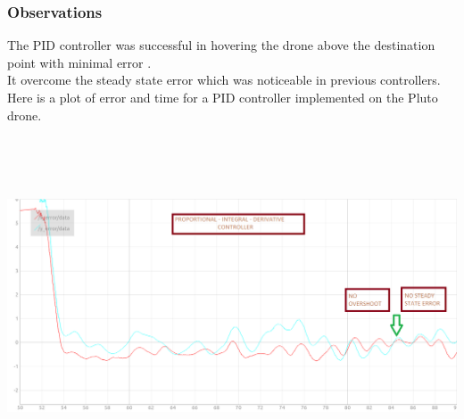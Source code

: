 \documentclass[a4paper,12pt,oneside]{book}
\begin{document}
\subsubsection{\textbf{Observations}}
The PID controller was successful in hovering the drone above the destination point with minimal error .\\
It overcome the steady state error which was noticeable in previous controllers.
Here is a plot of error and time for a PID controller implemented on the Pluto drone.
\begin{flushleft}
\includegraphics[width = 15cm , height= 10cm]{pid-1-no-z.png}
\end{flushleft}
 
\end{document}
